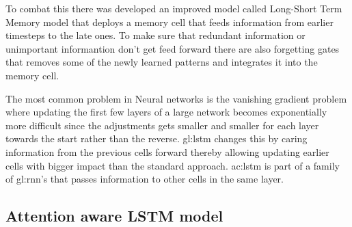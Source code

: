To combat this there was developed an improved model called Long-Short Term Memory model\cite{hochreiter_long_1997} that deploys a memory cell that feeds information from earlier timesteps to the late ones. To make sure that redundant information or unimportant informantion don't get feed forward there are also forgetting gates that removes some of the newly learned patterns and integrates it into the memory cell. 

The most common problem in Neural networks is the vanishing gradient problem where updating the first few layers of a large network becomes exponentially more difficult since the adjustments gets smaller and smaller for each layer towards the start rather than the reverse. \gls{gl:lstm} changes this by caring information from the previous cells forward thereby allowing updating earlier cells with bigger impact than the standard approach\cite{hochreiter_long_1997}. \acrshort{ac:lstm} is part of a family of \gls{gl:rnn}'s that passes information to other cells in the same layer.



\subsection[ILSTM]{Attention aware LSTM model}\label{sec:theory:Ilstm}

